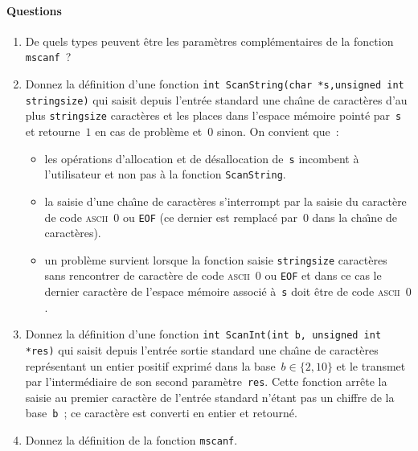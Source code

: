 \paragraph{Questions}
\begin{enumerate}
\item De quels types peuvent \^etre les param\`etres compl\'ementaires de la fonction
\verb+mscanf+~?
\item 
  Donnez la d\'efinition d'une fonction %
  \verb?int ScanString(char *s,unsigned int stringsize)? qui saisit
  depuis l'entr\'ee standard une cha\^\i{}ne de caract\`eres d'au plus
  \verb+stringsize+ caract\`eres et les places dans l'espace m\'emoire
  point\'e par~\verb+s+ et retourne~$1$ en cas de probl\`eme et~$0$
  sinon.  On convient que~:
\begin{itemize}
\item les op\'erations d'allocation et de d\'esallocation de~\verb+s+
  incombent \`a l'utilisateur et non pas \`a la fonction
  \verb+ScanString+.
\item la saisie d'une cha\^\i{}ne de caract\`eres s'interrompt par la
  saisie du caract\`ere de code \textsc{ascii}~$0$ ou \verb+EOF+ (ce dernier
  est remplac\'e par~$0$ dans la cha\^\i{}ne de caract\`eres).
\item un probl\`eme survient lorsque la fonction saisie
  \verb+stringsize+ caract\`eres sans rencontrer de caract\`ere de
  code \textsc{ascii}~$0$ ou \verb+EOF+ et dans ce cas le dernier caract\`ere
  de l'espace m\'emoire associ\'e \`a~\verb+s+ doit \^etre de code
  \textsc{ascii}~$0$.
\end{itemize}
\item Donnez la d\'efinition d'une fonction %
  \verb?int ScanInt(int b, unsigned int *res)? qui saisit depuis
  l'entr\'ee sortie standard une cha\^\i{}ne de caract\`eres repr\'esentant un entier positif exprim\'e dans la
  base~${b\in\{2,10\}}$ et le transmet par l'interm\'ediaire de son
  second param\`etre~\verb+res+. Cette fonction arr\^ete la saisie au
  premier caract\`ere de l'entr\'ee standard n'\'etant pas un chiffre
  de la base~\verb+b+~; ce caract\`ere est converti en entier et
  retourn\'e.
\item Donnez la d\'efinition de la fonction \verb?mscanf?.
\end{enumerate}

